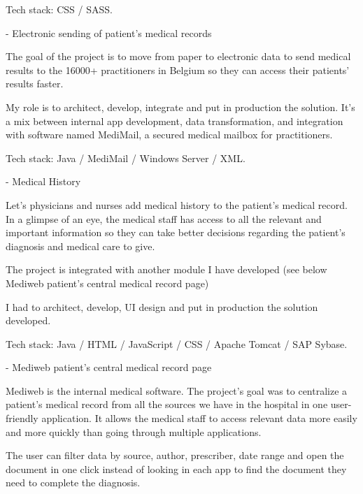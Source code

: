 \begin{cventries}
{Tech stack: CSS / SASS.

    }
    
    
  \cventry
    {-} %
    {Electronic sending of patient's medical records} %
    {} %
    {} %
    {
The goal of the project is to move from paper to electronic data to send medical results to the 16000+ practitioners in Belgium so they can access their patients' results faster.

My role is to architect, develop, integrate and put in production the solution. It's a mix between internal app development, data transformation, and integration with software named MediMail, a secured medical mailbox for practitioners. 

Tech stack: Java / MediMail / Windows Server / XML.

    }
    
   
  \cventry
    {-} %
    {Medical History} %
    {} %
    {} %
    {
Let's physicians and nurses add medical history to the patient's medical record.
In a glimpse of an eye, the medical staff has access to all the relevant and important information so they can take better decisions regarding the patient's diagnosis and medical care to give.

The project is integrated with another module I have developed (see below Mediweb patient's central medical record page)



I had to architect, develop, UI design and put in production the solution developed.

Tech stack: Java / HTML / JavaScript / CSS / Apache Tomcat / SAP Sybase.

    }
    
    
   
  \cventry
    {-} %
    {Mediweb patient's central medical record page} %
    {} %
    {} %
    {
Mediweb is the internal medical software. The project's goal was to centralize a patient's medical record from all the sources we have in the hospital in one user-friendly application. It allows the medical staff to access relevant data more easily and more quickly than going through multiple applications. 

The user can filter data by source, author, prescriber, date range and open the document in one click instead of looking in each app to find the document they need to complete the diagnosis.

}
\end{cventries}
